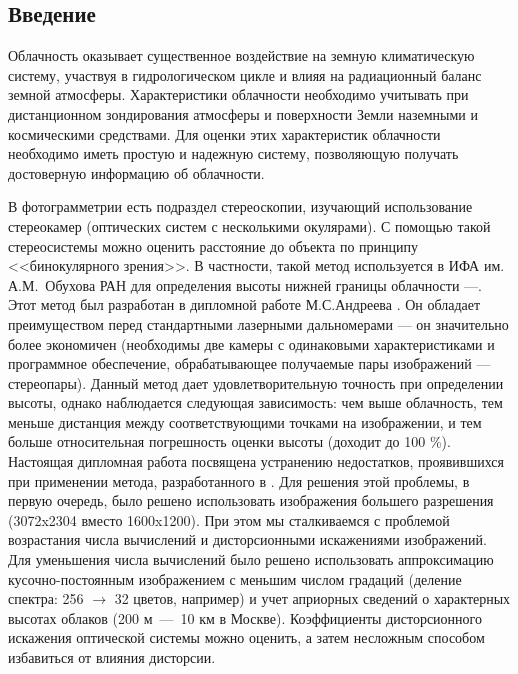 \begin{center}
  \section*{Введение}
\end{center}

Облачность оказывает существенное воздействие на земную климатическую систему,
участвуя в гидрологическом цикле и влияя на радиационный баланс земной атмосферы.
Характеристики облачности необходимо учитывать при дистанционном зондирования
атмосферы и поверхности Земли наземными и космическими средствами. Для оценки этих
характеристик облачности необходимо иметь простую и надежную систему,
позволяющую получать достоверную информацию об облачности.

В фотограмметрии есть подраздел стереоскопии, изучающий использование стереокамер (оптических систем с несколькими окулярами).
С помощью такой стереосистемы можно оценить расстояние до объекта по принципу <<бинокулярного зрения>>.
В частности, такой метод используется в
ИФА им. А.М.~Обухова РАН для определения высоты нижней границы облачности \cite{art:refined}---\cite{art:estimation4}.
Этот метод был разработан в дипломной работе М.С.Андреева \cite{book:andreev_diplom}.
Он обладает преимуществом перед стандартными лазерными дальномерами --- он значительно более экономичен
(необходимы две камеры с одинаковыми характеристиками и программное обеспечение, обрабатывающее получаемые пары изображений --- стереопары).
Данный метод дает удовлетворительную точность при определении высоты, однако наблюдается следующая зависимость: чем выше облачность,
тем меньше дистанция между соответствующими точками на изображении, и тем больше относительная погрешность оценки высоты (доходит до 100 \%).
Настоящая дипломная работа посвящена устранению недостатков, проявившихся при применении метода, разработанного в \cite{book:andreev_diplom}.
Для решения этой проблемы, в первую очередь, было решено использовать изображения большего разрешения (3072x2304 вместо 1600x1200).
При этом мы сталкиваемся с проблемой возрастания числа вычислений и дисторсионными искажениями изображений.
Для уменьшения числа вычислений было решено использовать аппроксимацию кусочно-постоянным изображением с меньшим числом градаций
(деление спектра: 256 $\rightarrow$ 32 цветов, например) и учет априорных сведений о характерных высотах облаков (200 м~---~10 км в Москве).
Коэффициенты дисторсионного искажения оптической системы можно оценить, а затем несложным способом избавиться от влияния дисторсии.


